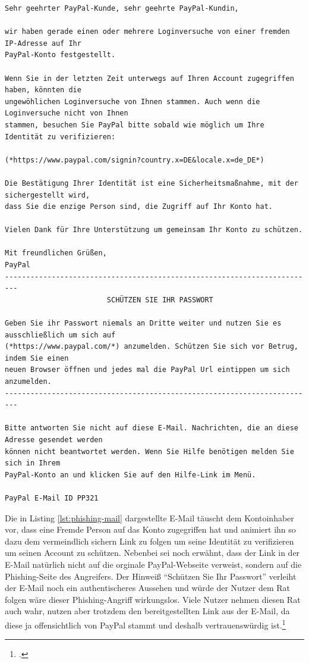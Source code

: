 \begin{scriptsize}
\begin{lstlisting}
Sehr geehrter PayPal-Kunde, sehr geehrte PayPal-Kundin,

wir haben gerade einen oder mehrere Loginversuche von einer fremden IP-Adresse auf Ihr
PayPal-Konto festgestellt.

Wenn Sie in der letzten Zeit unterwegs auf Ihren Account zugegriffen haben, könnten die
ungewöhlichen Loginversuche von Ihnen stammen. Auch wenn die Loginversuche nicht von Ihnen
stammen, besuchen Sie PayPal bitte sobald wie möglich um Ihre Identität zu verifizieren:

(*https://www.paypal.com/signin?country.x=DE&locale.x=de_DE*)

Die Bestätigung Ihrer Identität ist eine Sicherheitsmaßnahme, mit der sichergestellt wird,
dass Sie die enzige Person sind, die Zugriff auf Ihr Konto hat.

Vielen Dank für Ihre Unterstützung um gemeinsam Ihr Konto zu schützen.

Mit freundlichen Grüßen,
PayPal
-------------------------------------------------------------------------
                        SCHÜTZEN SIE IHR PASSWORT

Geben Sie ihr Passwort niemals an Dritte weiter und nutzen Sie es ausschließlich um sich auf
(*https://www.paypal.com/*) anzumelden. Schützen Sie sich vor Betrug, indem Sie einen
neuen Browser öffnen und jedes mal die PayPal Url eintippen um sich anzumelden.
-------------------------------------------------------------------------

Bitte antworten Sie nicht auf diese E-Mail. Nachrichten, die an diese Adresse gesendet werden
können nicht beantwortet werden. Wenn Sie Hilfe benötigen melden Sie sich in Ihrem
PayPal-Konto an und klicken Sie auf den Hilfe-Link im Menü.

PayPal E-Mail ID PP321
\end{lstlisting}
\end{scriptsize}

Die in Listing \ref{lst:phishing-mail} dargestellte E-Mail täuscht dem Kontoinhaber vor, dass eine Fremde Person auf das Konto zugegriffen hat und animiert ihn so dazu dem vermeindlich sichern Link zu folgen um seine Identität zu verifizieren um seinen Account zu schützen. Nebenbei sei noch erwähnt, dass der Link in der E-Mail natürlich nicht auf die orginale PayPal-Webseite verweist, sondern auf die Phishing-Seite des Angreifers. Der Hinweiß \enquote{Schützen Sie Ihr Passwort} verleiht der E-Mail noch ein authentischeres Aussehen und würde der Nutzer dem Rat folgen wäre dieser Phishing-Angriff wirkungslos. Viele Nutzer nehmen diesen Rat auch wahr, nutzen aber trotzdem den bereitgestellten Link aus der E-Mail, da diese ja offensichtlich von PayPal stammt und deshalb vertrauenswürdig ist.\footcite[Vgl.][10]{phishing}

